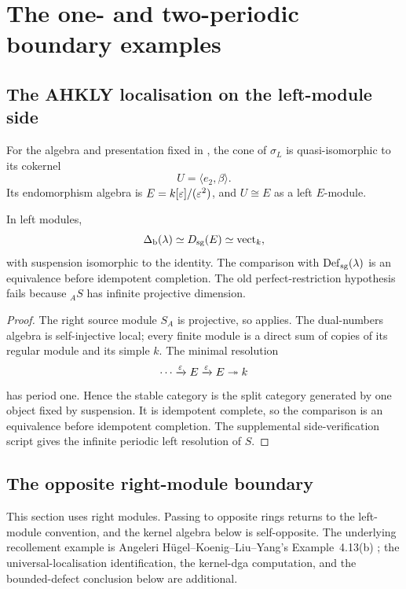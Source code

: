 
\section{The one- and two-periodic boundary examples}\label{sec:periodic-ladder}

\subsection{The AHKLY localisation on the left-module side}
For the algebra and presentation fixed in , the cone of \(\sigma_L\) is quasi-isomorphic to its cokernel
\[
 U=\langle e_2,\beta\rangle.
\]
Its endomorphism algebra is \(E=k[\varepsilon]/(\varepsilon^2)\), and \(U\cong E\) as a left \(E\)-module.

\begin{theorem}\label{thm:ahkly-left}
In left modules,
\[
 \Delta_{\mathrm b}(\lambda)\simeq D_{\mathrm{sg}}(E)\simeq\operatorname{vect}_k,
\]
with suspension isomorphic to the identity.  The comparison with \(\operatorname{Def}_{\mathrm{sg}}(\lambda)\) is an equivalence before idempotent completion.  The old perfect-restriction hypothesis fails because \({}_AS\) has infinite projective dimension.
\end{theorem}

\begin{proof}
The right source module \(S_A\) is projective, so  applies.  The dual-numbers algebra is self-injective local; every finite module is a direct sum of copies of its regular module and its simple \(k\).  The minimal resolution
\[
 \cdots\xrightarrow{\varepsilon}E\xrightarrow{\varepsilon}E\twoheadrightarrow k
\]
has period one.  Hence the stable category is the split category generated by one object fixed by suspension.  It is idempotent complete, so the comparison is an equivalence before idempotent completion.  The supplemental side-verification script gives the infinite periodic left resolution of \(S\).
\end{proof}

\subsection{The opposite right-module boundary}

This section uses right modules.  Passing to opposite rings returns to the left-module convention, and the kernel algebra below is self-opposite.  The underlying recollement example is Angeleri H\"ugel--Koenig--Liu--Yang's Example~4.13(b) \cite{AHKLY17}; the universal-localisation identification, the kernel-dga computation, and the bounded-defect conclusion below are additional.

